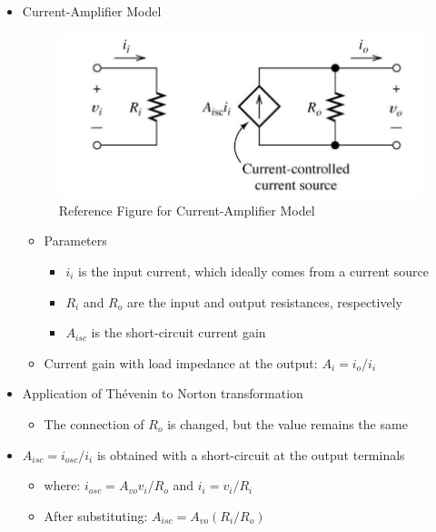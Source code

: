 \begin{itemize}

  \item Current-Amplifier Model

    \begin{figure}[H]
      \centering
      \includegraphics[width=.7\textwidth]{Images/CAM.png}
      \caption{Reference Figure for Current-Amplifier Model}
      \label{fig:1}
    \end{figure}

    \begin{itemize}

      \item Parameters

        \begin{itemize}

          \item $i_i$ is the input current, which ideally comes from a current source

          \item $R_i$ and $R_o$ are the input and output resistances, respectively

          \item $A_{isc}$ is the short-circuit current gain

        \end{itemize}

      \item Current gain with load impedance at the output: $A_i=i_o/i_i$

    \end{itemize}

  \item Application of Th\'evenin to Norton transformation

    \begin{itemize}

      \item The connection of $R_o$ is changed, but the value remains the same

    \end{itemize}

  \item $A_{isc}=i_{osc}/i_i$ is obtained with a short-circuit at the output terminals

    \begin{itemize}

      \item where: $i_{osc}=A_{vo}v_i/R_o$ and $i_i=v_i/R_i$

      \item After substituting: $A_{isc}=A_{vo}(R_i/R_o)$

    \end{itemize}

\end{itemize}



